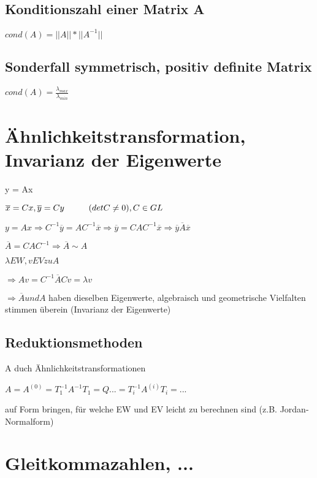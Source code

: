 \documentclass[12pt,a4paper]{article} %
\newcommand*\conj[1]{\overline{#1}}
\newcommand*\tab[1][1cm]{\hspace*{#1}}
\begin{document}
	\subsection{Konditionszahl einer Matrix A}
	
	$cond(A) = ||A||*||A^{-1}||$
	
	\subsection{Sonderfall symmetrisch, positiv definite Matrix}
	
	$cond(A) = \frac{ \lambda_{max}}{ \lambda_{min}}$
	
	\newpage
	
	\section{Ähnlichkeitstransformation, Invarianz der Eigenwerte}
	
	y = Ax
	
	$\conj{x} = Cx, \conj{y} = Cy \tab (det C \ne 0), C \in GL$ 
	
	$y = Ax \Rightarrow C^{-1} \conj{y} = AC^{-1} \conj{x} \Rightarrow \conj{y} = CAC^{-1} \conj{x} \Rightarrow \conj{y}\conj{A}\conj{x}$
	
	$\conj{A} = CAC^{-1} \Rightarrow \conj{A} \sim A$
	
	$\lambda EW, v EV zu A$
	
	$\Rightarrow Av = C^{-1}\conj{A}Cv = \lambda v$
	
	$\Rightarrow \conj{A} und A $ haben dieselben Eigenwerte, algebraisch und geometrische Vielfalten stimmen überein (Invarianz der Eigenwerte)
	
	\subsection{Reduktionsmethoden}
	
	A duch Ähnlichkeitstransformationen 
	
	$A = A^{(0)} = T_1^{-1} A^{-1}T_1 = Q ... = T_i^{-1}A^{(i)}T_i = ...$
	
	auf Form bringen, für welche EW und EV leicht zu berechnen sind (z.B. Jordan-Normalform)
	
	\newpage
	
	\section{Gleitkommazahlen, ...}
	
\end{document}
